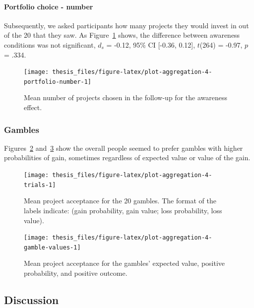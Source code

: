 \documentclass[a4paper, nobind, dvipsnames]{templates/ociamthesis}
\theoremstyle{definition}
\theoremstyle{definition}
\theoremstyle{definition}
\theoremstyle{definition}
\theoremstyle{remark}
\begin{document}
\hypertarget{portfolio-choice---number-2}{%
\paragraph{Portfolio choice - number}\label{portfolio-choice---number-2}}

Subsequently, we asked participants how many projects they would invest in out
of the 20 that they saw. As
Figure~\ref{fig:plot-aggregation-4-portfolio-number} shows, the difference
between awareness conditions was not significant,
\(d_s\) = -0.12, 95\% CI {[}-0.36, 0.12{]}, \(t\)(264) = -0.97, \(p\) = .334.



\begin{figure}
\texttt{[image: thesis\_files/figure-latex/plot-aggregation-4-portfolio-number-1]} \caption{Mean number of projects chosen in the follow-up for the awareness effect.}\label{fig:plot-aggregation-4-portfolio-number}
\end{figure}

\hypertarget{gambles-2}{%
\subsubsection{Gambles}\label{gambles-2}}

Figures~\ref{fig:plot-aggregation-4-trials}
and~\ref{fig:plot-aggregation-4-gamble-values} show the
overall people seemed to prefer gambles with higher probabilities of gain,
sometimes regardless of expected value or value of the gain.



\begin{figure}
\texttt{[image: thesis\_files/figure-latex/plot-aggregation-4-trials-1]} \caption{Mean project acceptance for the 20 gambles. The format of the labels indicate: (gain probability, gain value; loss probability, loss value).}\label{fig:plot-aggregation-4-trials}
\end{figure}



\begin{figure}
\texttt{[image: thesis\_files/figure-latex/plot-aggregation-4-gamble-values-1]} \caption{Mean project acceptance for the gambles' expected value, positive probability, and positive outcome.}\label{fig:plot-aggregation-4-gamble-values}
\end{figure}

\hypertarget{discussion-8}{%
\subsection{Discussion}\label{discussion-8}}
\end{document}
